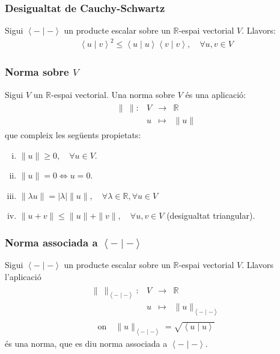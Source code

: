\subsubsection*{Desigualtat de Cauchy-Schwartz}
Sigui $\left< - \mid - \right>$ un producte escalar sobre un $\mathbb{R}$-espai vectorial $V$. Llavors:
\begin{align}
    \left< u \mid v \right>^{2} \leq \left< u \mid u \right> \left< v \mid v \right>, \quad \forall u, v \in V
\end{align}

\subsubsection*{Norma sobre $V$}
Sigui $V$ un $\mathbb{R}$-espai vectorial. Una norma sobre $V$ és una aplicació:
\begin{align}
    \begin{matrix} \|~\|: & V & \to & \mathbb{R} \\ & u & \mapsto & \| u \| \end{matrix}
\end{align}
que compleix les següents propietats:
\begin{enumerate}[i)]
    \item $\| u \| \geq 0, \quad \forall u \in V$.
    \item $\| u \| = 0 \Leftrightarrow u = 0$.
    \item $\| \lambda u \| = | \lambda | \| u \|, \quad \forall \lambda \in \mathbb{R}, \forall u \in V$
    \item $\| u + v \| \leq \| u \| + \| v \|,  \quad \forall u, v \in V$ (desigualtat triangular).
\end{enumerate}

\subsubsection*{Norma associada a $\left< - \mid - \right>$}
Sigui $\left< - \mid - \right>$ un producte escalar sobre un $\mathbb{R}$-espai vectorial $V$. Llavors l'aplicació
\begin{align}
    \begin{matrix} \|~\|_{\left< - \mid - \right>} : & V & \to & \mathbb{R} \\ & u & \mapsto & \| u \|_{\left< - \mid - \right>} \end{matrix}
\end{align}
\begin{align}
    \text{on} \quad \| u \|_{\left< - \mid - \right>} = \sqrt{\left< u \mid u \right>}
\end{align}
és una norma, que es diu norma associada a $\left< - \mid - \right>$.

